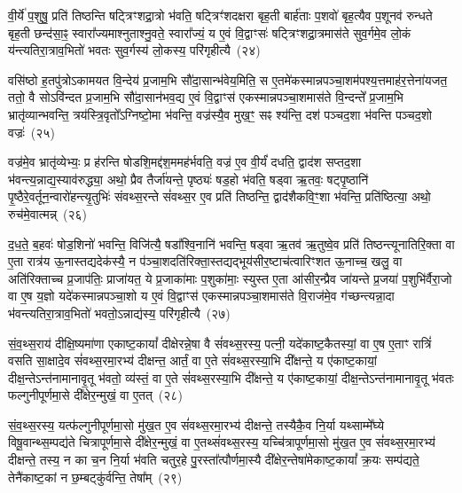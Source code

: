 वी॒र्ये॑ प॒शुषु॒ प्रति॑ तिष्ठन्ति षट्त्रिꣳशद्रा॒त्रो भ॑वति॒ षट्त्रिꣳ॑शदक्षरा बृह॒ती बार्\mbox{}ह॑ताः प॒शवो॑ बृह॒त्यैव प॒शूनव॑ रुन्धते बृह॒ती छन्द॑सा॒ꣴ॒ स्वारा᳚ज्यमाश्नुताश्नु॒वते॒ स्वारा᳚ज्यं॒ य ए॒वं वि॒द्वाꣳसः॑ षट्त्रिꣳशद्रा॒त्रमास॑ते सुव॒र्गमे॒व लो॒कं य॑न्त्यतिरा॒त्राव॒भितो॑ भवतः सुव॒र्गस्य॑ लो॒कस्य॒ परि॑गृहीत्यै~(२४)

{\anuvakamend[{अ॒ति॒रा॒त्र ओज॑स्ये॒व षट्त्रिꣳ॑शच्च}]}%

वसि॑ष्ठो ह॒तपु॑त्रो\-ऽकामयत वि॒न्देय॑ प्र॒जाम॒भि सौ॑दा॒सान्भ॑वेय॒मिति॒ स ए॒तमे॑कस्मान्नपञ्चा॒शम॑पश्य॒त्तमाह॑र॒त्तेना॑यजत॒ ततो॒ वै सो\-ऽवि॑न्दत प्र॒जाम॒भि सौ॑दा॒सान॑भव॒द्य ए॒वं वि॒द्वाꣳस॑ एकस्मान्नपञ्चा॒शमास॑ते वि॒न्दन्ते᳚ प्र॒जाम॒भि भ्रातृ॑व्यान्भवन्ति॒ त्रय॑स्त्रि॒वृतो᳚\-ऽग्निष्टो॒मा भ॑वन्ति॒ वज्र॑स्यै॒व मुख॒ꣳ॒ सꣴ श्य॑न्ति॒ दश॑ पञ्चद॒शा भ॑वन्ति पञ्चद॒शो वज्रः॑~(२५)

वज्र॑मे॒व भ्रातृ॑व्येभ्यः॒ प्र ह॑रन्ति षोडशि॒मद्द॑श॒ममह॑र्भवति॒ वज्र॑ ए॒व वी॒र्यं॑ दधति॒ द्वाद॑श सप्तद॒शा भ॑वन्त्य॒न्नाद्य॒स्याव॑रुद्ध्या॒ अथो॒ प्रैव तैर्जा॑यन्ते॒ पृष्ठ्यः॑ षड॒हो भ॑वति॒ षड्वा ऋ॒तवः॒ षट्पृ॒ष्ठानि॑ पृ॒ष्ठैरे॒वर्तून॒न्वारो॑हन्त्यृ॒तुभिः॑ संवथ्स॒रन्ते सं॑वथ्स॒र ए॒व प्रति॑ तिष्ठन्ति॒ द्वाद॑शैकवि॒ꣳ॒शा भ॑वन्ति॒ प्रति॑ष्ठित्या॒ अथो॒ रुच॑मे॒वात्मन्न्~(२६)

द॒ध॒ते॒ ब॒हवः॑ षोड॒शिनो॑ भवन्ति॒ विजि॑त्यै॒ षडा᳚श्वि॒नानि॑ भवन्ति॒ षड्वा ऋ॒तव॑ ऋ॒तुष्वे॒व प्रति॑ तिष्ठन्त्यूनातिरि॒क्ता वा ए॒ता रात्र॑य ऊ॒नास्तद्यदेक॑स्यै॒ न प॑ञ्चा॒शदति॑रिक्ता॒स्तद्यद्भूय॑सीर॒ष्टाच॑त्वारिꣳशत ऊ॒नाच्च॒ खलु॒ वा अति॑रिक्ताच्च प्र॒जाप॑तिः॒ प्राजा॑यत॒ ये प्र॒जाका॑माः प॒शुका॑माः॒ स्युस्त ए॒ता आ॑सीर॒न्प्रैव जा॑यन्ते प्र॒जया॑ प॒शुभि॑र्वैरा॒जो वा ए॒ष य॒ज्ञो यदे॑कस्मान्नपञ्चा॒शो य ए॒वं वि॒द्वाꣳस॑ एकस्मान्नपञ्चा॒शमास॑ते वि॒राज॑मे॒व ग॑च्छन्त्यन्ना॒दा भ॑वन्त्यतिरा॒त्राव॒भितो॑ भवतो॒\-ऽन्नाद्य॑स्य॒ परि॑गृहीत्यै~(२७)

{\anuvakamend[{वज्र॑ आ॒त्मन्प्र॒जया॒ द्वाविꣳ॑शतिश्च}]}%

सं॒व॒थ्स॒राय॑ दीक्षि॒ष्यमा॑णा एकाष्ट॒कायां᳚ दीक्षेरन्ने॒षा वै सं॑वथ्स॒रस्य॒ पत्नी॒ यदे॑काष्ट॒कैतस्यां॒ वा ए॒ष ए॒ताꣳ रात्रिं॑ वसति सा॒क्षादे॒व सं॑वथ्स॒रमा॒रभ्य॑ दीक्षन्त॒ आर्तं॒ वा ए॒ते सं॑वथ्स॒रस्या॒भि दी᳚क्षन्ते॒ य ए॑काष्ट॒कायां॒ दीक्ष॒न्ते\-ऽन्त॑नामानावृ॒तू भ॑वतो॒ व्य॑स्तं॒ वा ए॒ते सं॑वथ्स॒रस्या॒भि दी᳚क्षन्ते॒ य ए॑काष्ट॒कायां॒ दीक्ष॒न्ते\-ऽन्त॑नामानावृ॒तू भ॑वतः फल्गुनीपूर्णमा॒से दी᳚क्षेर॒न्मुखं॒ वा ए॒तत्~(२८)

सं॒व॒थ्स॒रस्य॒ यत्फ॑ल्गुनीपूर्णमा॒सो मु॑ख॒त ए॒व सं॑वथ्स॒रमा॒रभ्य॑ दीक्षन्ते॒ तस्यैकै॒व नि॒र्या यथ्साम्मे᳚घ्ये विषू॒वान्थ्स॒म्पद्य॑ते चित्रापूर्णमा॒से दी᳚क्षेर॒न्मुखं॒ वा ए॒तथ्सं॑वथ्स॒रस्य॒ यच्चि॑त्रापूर्णमा॒सो मु॑ख॒त ए॒व सं॑वथ्स॒रमा॒रभ्य॑ दीक्षन्ते॒ तस्य॒ न का च॒न नि॒र्या भ॑वति चतुर॒हे पु॒रस्ता᳚त्पौर्णमा॒स्यै दी᳚क्षेर॒न्तेषा॑मेकाष्ट॒कायां᳚ क्र॒यः सम्प॑द्यते॒ तेनै॑काष्ट॒कां न छ॒म्बट्कु॑र्वन्ति॒ तेषा᳚म्~(२९)

